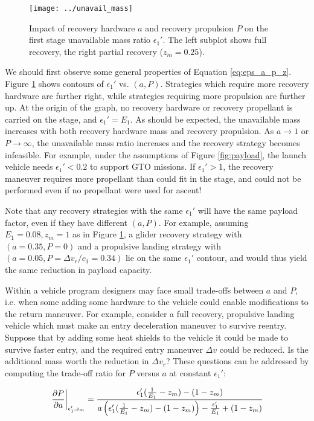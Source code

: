 \documentclass[conf]{new-aiaa}
\begin{document}
\begin{figure}[hbt!]
	\centering
	\texttt{[image: ../unavail\_mass]}
	\caption{\label{fig:unavail_mass} Impact of recovery hardware $a$ and recovery propulsion $P$ on the first stage unavailable mass ratio $\epsilon_1'$. The left subplot shows full recovery, the right partial recovery ($z_m=0.25$).}
\end{figure}

We should first observe some general properties of Equation \ref{eq:eps_a_p_z}. Figure \ref{fig:unavail_mass} shows contours of $\epsilon_1'$ vs. $(a, P)$. Strategies which require more recovery hardware are further right, while strategies requiring more propulsion are further up. At the origin of the graph, no recovery hardware or recovery propellant is carried on the stage, and $\epsilon_1' = E_1$. As should be expected, the unavailable mass increases with both recovery hardware mass and recovery propulsion. As $a \rightarrow 1$ or $P \rightarrow \infty$, the unavailable mass ratio increases and the recovery strategy becomes infeasible. For example, under the assumptions of Figure \ref{fig:payload}, the launch vehicle needs $\epsilon_1' < 0.2$ to support GTO missions. If $\epsilon_1' > 1$, the recovery maneuver requires more propellant than could fit in the stage, and could not be performed even if no propellant were used for ascent!

Note that any recovery strategies with the same $\epsilon_1'$ will have the same payload factor, even if they have different $(a, P)$. For example, assuming $E_1=0.08, z_m=1$ as in Figure \ref{fig:unavail_mass}, a glider recovery strategy with $(a=0.35, P=0)$ and a propulsive landing strategy with $(a=0.05, P = \Delta v_r/c_1 = 0.34)$ lie on the same $\epsilon_1'$ contour, and would thus yield the same reduction in payload capacity.

Within a vehicle program designers may face small trade-offs between $a$ and $P$, i.e. when some adding some hardware to the vehicle could enable modifications to the return maneuver. For example, consider a full recovery, propulsive landing vehicle which must make an entry deceleration maneuver to survive reentry. Suppose that by adding some heat shields to the vehicle it could be made to survive faster entry, and the required entry maneuver $\Delta v$ could be reduced. Is the additional mass worth the reduction in $\Delta v_r$? These questions can be addressed by computing the trade-off ratio for $P$ versus $a$ at constant $\epsilon_1'$:

\begin{equation}
\left. \pdv{P}{a} \right|_{\epsilon_1', z_m} = \frac{\epsilon_1' (\frac{1}{E_1} - z_m) - (1 - z_m)}{a \left( \epsilon_1' (\frac{1}{E_1} - z_m) - (1 - z_m) \right) - \frac{\epsilon_1'}{E_1} + (1 - z_m)}
\end{equation}
\end{document}
